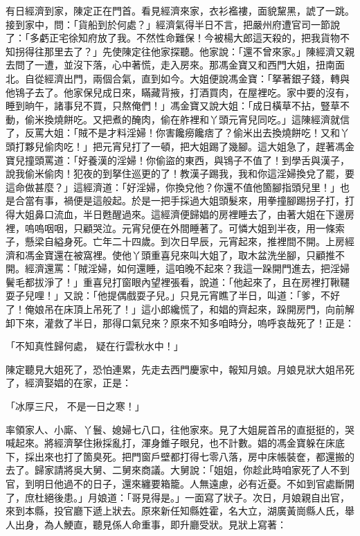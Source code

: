 \begin{showcontents}{}
有日經濟到家，陳定正在門首。看見經濟來家，衣衫襤褸，面貌黧黑，諕了一跳。接到家中，問：「貨船到於何處？」經濟氣得半日不言，把嚴州府遭官司一節說了：「多虧正宅徐知府放了我。不然性命難保！今被楊大郎這天殺的，把我貨物不知拐得往那里去了？」先使陳定往他家探聽。他家說：「還不曾來家。」陳經濟又親去問了一遭，並沒下落，心中著慌，走入房來。那馮金寶又和西門大姐，扭南面北。自從經濟出門，兩個合氣，直到如今。大姐便說馮金寶：「拏著銀子錢，轉與他鴇子去了。他家保兒成日來，瞞藏背掖，打酒買肉，在屋裡吃。家中要的沒有，睡到晌午，諸事兒不買，只熬俺們！」馮金寶又說大姐：「成日橫草不拈，豎草不動，偷米換燒餅吃。又把煮的醃肉，偷在舴裡和丫頭元宵兒同吃。」這陳經濟就信了，反罵大姐：「賊不是才料淫婦！你害饞癆饞痞了？偷米出去換燒餅吃！又和丫頭打夥兒偷肉吃！」把元宵兒打了一頓，把大姐踢了幾腳。這大姐急了，趕著馮金寶兒撞頭罵道：「好養漢的淫婦！你偷盜的東西，與鴇子不值了！到學舌與漢子，說我偷米偷肉！犯夜的到拏住巡更的了！教漢子踢我，我和你這淫婦換兌了罷，要這命做甚麼？」這經濟道：「好淫婦，你換兌他？你還不值他箇腳指頭兒里！」也是合當有事，禍便是這般起。於是一把手採過大姐頭髮來，用拳撞腳踢拐子打，打得大姐鼻口流血，半日甦醒過來。這經濟便歸娼的房裡睡去了，由著大姐在下邊房裡，嗚嗚咽咽，只顧哭泣。元宵兒便在外間睡著了。可憐大姐到半夜，用一條索子，懸梁自縊身死。亡年二十四歲。到次日早辰，元宵起來，推裡間不開。上房經濟和馮金寶還在被窩裡。使他丫頭重喜兒來叫大姐了，取木盆洗坐腳，只顧推不開。經濟還罵：「賊淫婦，如何還睡，這咱晚不起來？我這一跺開門進去，把淫婦鬢毛都拔淨了！」重喜兒打窗眼內望裡張看，說道：「他起來了，且在房裡打鞦韆耍子兒哩！」又說：「他提偶戲耍子兒。」只見元宵瞧了半日，叫道：「爹，不好了！俺娘吊在床頂上吊死了！」這小郎纔慌了，和娼的齊起來，跺開房門，向前解卸下來，灌救了半日，那得口氣兒來？原來不知多咱時分，嗚呼哀哉死了！正是：

「不知真性歸何處，  疑在行雲秋水中！」

陳定聽見大姐死了，恐怕連累，先走去西門慶家中，報知月娘。月娘見狀大姐吊死了，經濟娶娼的在家，正是：

「冰厚三尺，  不是一日之寒！」

率領家人、小廝、丫鬟、媳婦七八口，往他家來。見了大姐屍首吊的直挺挺的，哭喊起來。將經濟拏住揪採亂打，渾身錐子眼兒，也不計數。娼的馮金寶躲在床底下，採出來也打了箇臭死。把門窗戶壁都打得七零八落，房中床帳裝奩，都還搬的去了。歸家請將吳大舅、二舅來商議。大舅說：「姐姐，你趁此時咱家死了人不到官，到明日他過不的日子，還來纏要箱籠。人無遠慮，必有近憂。不如到官處斷開了，庶杜絕後患。」月娘道：「哥見得是。」一面寫了狀子。次日，月娘親自出官，來到本縣，投官廳下遞上狀去。原來新任知縣姓霍，名大立，湖廣黃崗縣人氏，舉人出身，為人鯁直，聽見係人命重事，即升廳受狀。見狀上寫著：


\end{showcontents}
